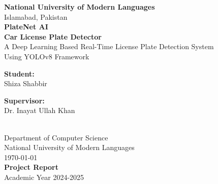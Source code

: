 \documentclass[12pt,a4paper]{article}
\begin{document}
\begin{titlepage}
\centering

\vspace*{1cm}
{\Large \textbf{National University of Modern Languages}}\\
{\large Islamabad, Pakistan}\\[2cm]

\vspace*{1cm}
{\Huge \textbf{PlateNet AI}}\\[0.5cm]
{\Large \textbf{Car License Plate Detector}}\\[1cm]

\vspace*{1cm}
{\large A Deep Learning Based Real-Time License Plate Detection System}\\
{\large Using YOLOv8 Framework}\\[2cm]

\vspace*{1cm}
\begin{minipage}{0.4\textwidth}
\begin{flushleft}
\textbf{Student:}\\
Shiza Shabbir
\end{flushleft}
\end{minipage}
\hfill
\begin{minipage}{0.4\textwidth}
\begin{flushright}
\textbf{Supervisor:}\\
Dr. Inayat Ullah Khan
\end{flushright}
\end{minipage}\\[2cm]

\vspace*{1cm}
{\large Department of Computer Science}\\
{\large National University of Modern Languages}\\[1cm]

\vspace*{1cm}
{\large \today}\\[2cm]

\vfill
{\large \textbf{Project Report}}\\
{\large Academic Year 2024-2025}

\end{titlepage}

\tableofcontents
\newpage
\end{document}
